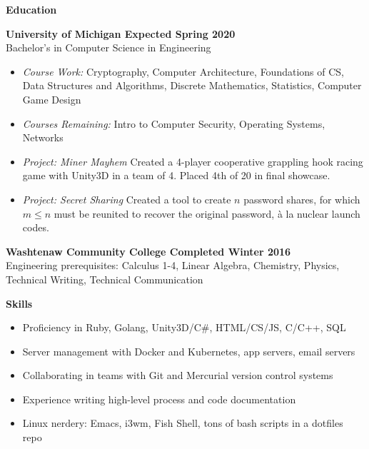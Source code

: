 \documentclass[10pt,letter]{article}
\begin{document}
\vspace{0.25in}
{\LARGE\textbf{Education}}
\vspace{0.15in}

\textbf{University of Michigan \hfill  Expected Spring 2020} \\
Bachelor's in Computer Science in Engineering
\begin{itemize}[leftmargin=1em]
  \setlength\itemsep{-0.3em}
  \item \textit{Course Work: } Cryptography, Computer Architecture, Foundations of CS, Data Structures and Algorithms, Discrete Mathematics, Statistics, Computer Game Design
  \item \textit{Courses Remaining: } Intro to Computer Security, Operating Systems, Networks
  \item \textit{Project: Miner Mayhem } Created a 4-player cooperative grappling hook racing game with Unity3D in a team of 4. Placed 4th of 20 in final showcase.
  \item \textit{Project: Secret Sharing } Created a tool to create $n$ password shares, for which $m \leq n$ must be reunited to recover the original password, à la nuclear launch codes.
\end{itemize}

\vspace{0.15in}

\textbf{Washtenaw Community College \hfill  Completed Winter 2016} \\
Engineering prerequisites: Calculus 1-4, Linear Algebra, Chemistry, Physics, Technical Writing, Technical Communication

\vspace{0.25in}

{\LARGE\textbf{Skills}}

\begin{itemize}[leftmargin=1em]
  \setlength\itemsep{-0.3em}
  \item{Proficiency in Ruby, Golang, Unity3D/C\#, HTML/CS/JS, C/C++, SQL}
  \item{Server management with Docker and Kubernetes, app servers, email servers}
  \item{Collaborating in teams with Git and Mercurial version control systems}
  \item{Experience writing high-level process and code documentation}
  \item{Linux nerdery: Emacs, i3wm, Fish Shell, tons of bash scripts in a dotfiles repo}
\end{itemize}
\end{document}
